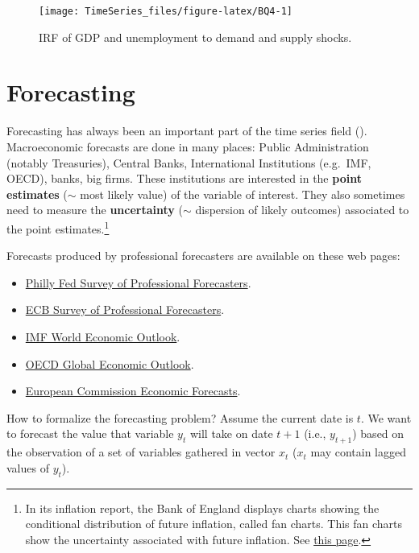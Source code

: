 \documentclass[
  12pt,
]{book}
\providecommand{\tightlist}{%
  \setlength{\itemsep}{0pt}\setlength{\parskip}{0pt}}
\theoremstyle{definition}
\theoremstyle{definition}
\theoremstyle{definition}
\theoremstyle{definition}
\theoremstyle{remark}
\begin{document}
\begin{figure}
\texttt{[image: TimeSeries\_files/figure-latex/BQ4-1]} \caption{IRF of GDP and unemployment to demand and supply shocks.}\label{fig:BQ4}
\end{figure}

\hypertarget{forecasting}{%
\chapter{Forecasting}\label{forecasting}}

Forecasting has always been an important part of the time series field (\citet{DEGOOIJER2006443}). Macroeconomic forecasts are done in many places: Public Administration (notably Treasuries), Central Banks, International Institutions (e.g.~IMF, OECD), banks, big firms. These institutions are interested in the \textbf{point estimates} (\(\sim\) most likely value) of the variable of interest. They also sometimes need to measure the \textbf{uncertainty} (\(\sim\) dispersion of likely outcomes) associated to the point estimates.\footnote{In its inflation report, the Bank of England displays charts showing the conditional distribution of future inflation, called fan charts. This fan charts show the uncertainty associated with future inflation. See \href{https://www.bankofengland.co.uk/quarterly-bulletin/1998/q1/the-inflation-report-projections-understanding-the-fan-chart}{this page}.}

Forecasts produced by professional forecasters are available on these web pages:

\begin{itemize}
\tightlist
\item
  \href{https://www.philadelphiafed.org/research-and-data/real-time-center/survey-of-professional-forecasters/}{Philly Fed Survey of Professional Forecasters}.
\item
  \href{http://www.ecb.europa.eu/stats/prices/indic/forecast/html/index.en.html}{ECB Survey of Professional Forecasters}.
\item
  \href{https://www.imf.org/external/pubs/ft/weo/2016/update/01/}{IMF World Economic Outlook}.
\item
  \href{http://www.oecd.org/eco/economicoutlook.htm}{OECD Global Economic Outlook}.
\item
  \href{http://ec.europa.eu/economy_finance/eu/forecasts/index_en.htm}{European Commission Economic Forecasts}.
\end{itemize}

How to formalize the forecasting problem? Assume the current date is \(t\). We want to forecast the value that variable \(y_t\) will take on date \(t+1\) (i.e., \(y_{t+1}\)) based on the observation of a set of variables gathered in vector \(x_t\) (\(x_t\) may contain lagged values of \(y_t\)).
\end{document}
